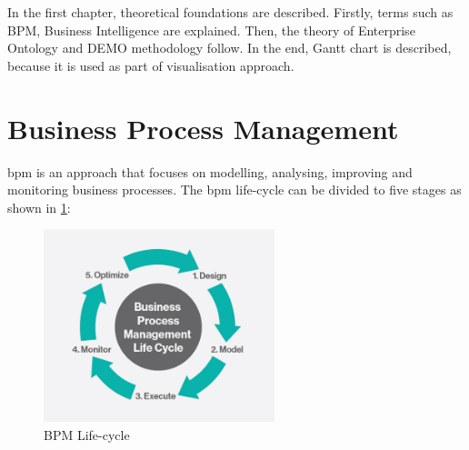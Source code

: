 In the first chapter, theoretical foundations are described. Firstly, terms such as BPM, Business Intelligence are explained. Then, the theory of Enterprise Ontology and DEMO methodology follow. In the end, Gantt chart is described, because it is used as part of visualisation approach. 
\section{Business Process Management}
\gls{bpm} is an approach that focuses on modelling, analysing, improving and monitoring business processes. 
The \gls{bpm} life-cycle can be divided to five stages as shown in \cref{fig:bpm-lifecycle}:

\begin{figure}[ht!]
	\centering
    \includegraphics[width=0.6\textwidth, keepaspectratio]{img/bpm-lifecycle.jpg}
    \caption{BPM Life-cycle \cite{harvey-koeppel-bpm-lifecycle-2015}}
    \label{fig:bpm-lifecycle}
\end{figure}

